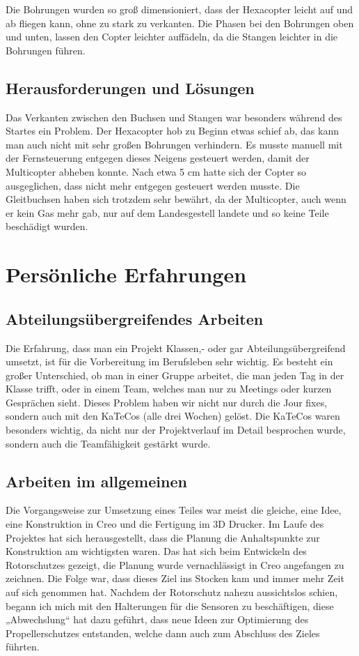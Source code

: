 	Die Bohrungen wurden so groß dimensioniert, dass der Hexacopter leicht auf und ab fliegen kann, ohne zu stark zu verkanten.
	Die Phasen bei den Bohrungen oben und unten, lassen den Copter leichter auffädeln, da die Stangen leichter in die Bohrungen führen.

	\subsection{Herausforderungen und Lösungen}

	Das Verkanten zwischen den Buchsen und Stangen war besonders während des Startes ein Problem.
	Der Hexacopter hob zu Beginn etwas  schief ab, das kann man auch nicht mit sehr großen Bohrungen verhindern.
	Es musste manuell mit der Fernsteuerung entgegen dieses Neigens gesteuert werden, damit der Multicopter abheben konnte.
	Nach etwa 5 cm hatte sich der Copter so ausgeglichen, dass nicht mehr entgegen gesteuert werden musste.
	Die Gleitbuchsen haben sich trotzdem sehr bewährt, da der Multicopter, auch wenn er kein Gas mehr gab, nur auf dem Landesgestell landete und so keine Teile beschädigt wurden.

			\newpage

\section{Persönliche Erfahrungen}

	\subsection{Abteilungsübergreifendes Arbeiten}

	Die Erfahrung, dass man ein Projekt Klassen,- oder gar Abteilungsübergreifend umsetzt, ist für die Vorbereitung im Berufsleben sehr wichtig.
	Es besteht ein großer Unterschied, ob man in einer Gruppe arbeitet, die man jeden Tag in der Klasse trifft, oder in einem Team, welches man nur zu Meetings oder kurzen Gesprächen sieht.
	Dieses Problem haben wir nicht nur durch die Jour fixes, sondern auch mit den KaTeCos (alle drei Wochen) gelöst.
	Die KaTeCos waren besonders wichtig, da nicht nur der Projektverlauf im Detail besprochen wurde, sondern auch die Teamfähigkeit gestärkt wurde.

	\subsection{Arbeiten im allgemeinen}

	Die Vorgangsweise zur Umsetzung eines Teiles war meist die gleiche, eine Idee, eine Konstruktion in Creo und die Fertigung im 3D Drucker.
	Im Laufe des Projektes hat sich herausgestellt, dass die Planung \bzw die Anhaltspunkte zur Konstruktion am wichtigsten waren.
	Das hat sich beim Entwickeln des Rotorschutzes gezeigt, die Planung wurde vernachlässigt in Creo angefangen zu zeichnen.
	Die Folge war, dass dieses Ziel ins Stocken kam und immer mehr Zeit auf sich genommen hat.
	Nachdem der Rotorschutz nahezu aussichtslos schien, begann ich mich mit den Halterungen für die Sensoren zu beschäftigen,
	diese „Abwechslung“ hat dazu geführt, dass neue Ideen zur Optimierung des Propellerschutzes entstanden, welche dann auch zum Abschluss des Zieles führten.

